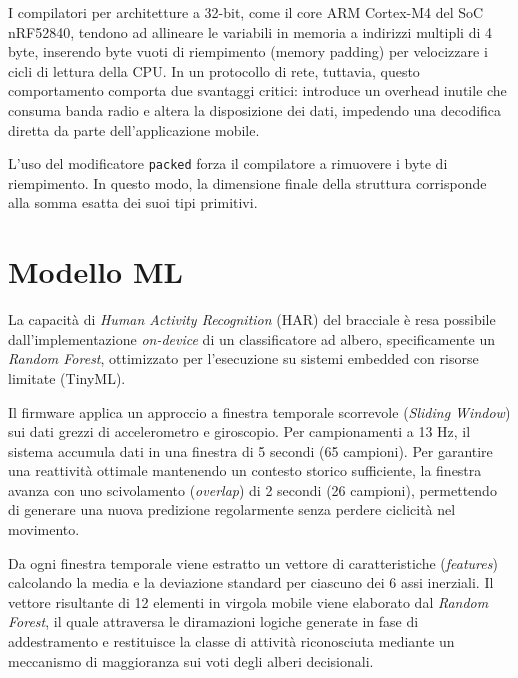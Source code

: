 I compilatori per architetture a 32-bit, come il core ARM Cortex-M4 del SoC nRF52840, tendono ad allineare le variabili in memoria a indirizzi multipli di 4 byte, inserendo byte vuoti di riempimento (memory padding) per velocizzare i cicli di lettura della CPU. In un protocollo di rete, tuttavia, questo comportamento comporta due svantaggi critici: introduce un overhead inutile che consuma banda radio e altera la disposizione dei dati, impedendo una decodifica diretta da parte dell'applicazione mobile.

L'uso del modificatore \texttt{packed} forza il compilatore a rimuovere i byte di riempimento. In questo modo, la dimensione finale della struttura corrisponde alla somma esatta dei suoi tipi primitivi.

\section{Modello ML} %
La capacità di \textit{Human Activity Recognition} (HAR) del bracciale è resa possibile dall'implementazione \textit{on-device} di un classificatore ad albero, specificamente un \textit{Random Forest}, ottimizzato per l'esecuzione su sistemi embedded con risorse limitate (TinyML).

Il firmware applica un approccio a finestra temporale scorrevole (\textit{Sliding Window}) sui dati grezzi di accelerometro e giroscopio. Per campionamenti a 13 Hz, il sistema accumula dati in una finestra di 5 secondi (65 campioni). Per garantire una reattività ottimale mantenendo un contesto storico sufficiente, la finestra avanza con uno scivolamento (\textit{overlap}) di 2 secondi (26 campioni), permettendo di generare una nuova predizione regolarmente senza perdere ciclicità nel movimento.

Da ogni finestra temporale viene estratto un vettore di caratteristiche (\textit{features}) calcolando la media e la deviazione standard per ciascuno dei 6 assi inerziali. Il vettore risultante di 12 elementi in virgola mobile viene elaborato dal \textit{Random Forest}, il quale attraversa le diramazioni logiche generate in fase di addestramento e restituisce la classe di attività riconosciuta mediante un meccanismo di maggioranza sui voti degli alberi decisionali.